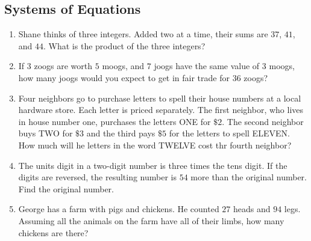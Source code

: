 \documentclass{article}
\begin{document}
    \subsection*{Systems of Equations}
    \begin{enumerate}[resume]
        \item Shane thinks of three integers. Added two at a time, their sums
        are $37$, $41$, and $44$. What is the product of the three integers?
        \vspace{3cm}
        \item If $3$ zoogs are worth $5$ moogs, and $7$ joogs have the same
        value of $3$ moogs, how many joogs would you expect to get in fair trade
        for $36$ zoogs?
        \vspace{3cm}
        \item Four neighbors go to purchase letters to spell their house numbers
        at a local hardware store. Each letter is priced separately. The first
        neighbor, who lives in house number one, purchases the letters ONE for
        $\$2$. The second neighbor buys TWO for $\$3$ and the third pays $\$5$
        for the letters to spell ELEVEN. How much will he letters in the word
        TWELVE cost thr fourth neighbor?
        \vspace{3cm}
        \item The units digit in a two-digit number is three times the tens
        digit. If the digits are reversed, the resulting number is $54$ more
        than the original number. Find the original number.
        \vspace{3cm}
        \item George has a farm with pigs and chickens. He counted $27$ heads
        and $94$ legs. Assuming all the animals on the farm have all of their
        limbs, how many chickens are there?
        \vspace{3cm}
    \end{enumerate}
\end{document}

